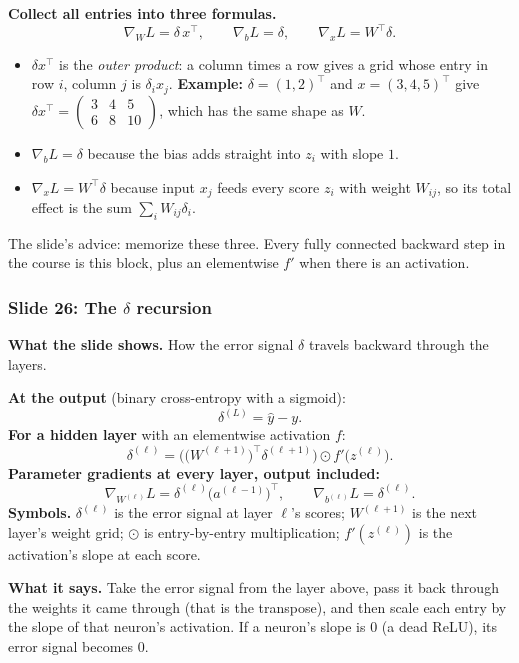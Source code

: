 \textbf{Collect all entries into three formulas.}
\[
\nabla_WL=\delta\,x^\top, \qquad \nabla_bL=\delta, \qquad \nabla_xL=W^\top\delta .
\]
\begin{itemize}
\item $\delta x^\top$ is the \emph{outer product}: a column times a row gives a grid whose entry in row $i$, column $j$ is $\delta_ix_j$. \textbf{Example:} $\delta=(1,2)^\top$ and $x=(3,4,5)^\top$ give $\delta x^\top=\begin{pmatrix}3&4&5\\6&8&10\end{pmatrix}$, which has the same shape as $W$.
\item $\nabla_bL=\delta$ because the bias adds straight into $z_i$ with slope $1$.
\item $\nabla_xL=W^\top\delta$ because input $x_j$ feeds every score $z_i$ with weight $W_{ij}$, so its total effect is the sum $\sum_iW_{ij}\delta_i$.
\end{itemize}
The slide's advice: memorize these three. Every fully connected backward step in the course is this block, plus an elementwise $f'$ when there is an activation.

\subsubsection{Slide 26: The $\delta$ recursion}

\textbf{What the slide shows.} How the error signal $\delta$ travels backward through the layers.

\textbf{At the output} (binary cross-entropy with a sigmoid):
\[
\delta^{(L)}=\hat{y}-y .
\]
\textbf{For a hidden layer} with an elementwise activation $f$:
\[
\delta^{(\ell)}=\Big(\big(W^{(\ell+1)}\big)^\top\delta^{(\ell+1)}\Big)\odot f'\big(z^{(\ell)}\big).
\]
\textbf{Parameter gradients at every layer, output included:}
\[
\nabla_{W^{(\ell)}}L=\delta^{(\ell)}\big(a^{(\ell-1)}\big)^\top, \qquad \nabla_{b^{(\ell)}}L=\delta^{(\ell)} .
\]
\textbf{Symbols.} $\delta^{(\ell)}$ is the error signal at layer $\ell$'s scores; $W^{(\ell+1)}$ is the next layer's weight grid; $\odot$ is entry-by-entry multiplication; $f'(z^{(\ell)})$ is the activation's slope at each score.

\textbf{What it says.} Take the error signal from the layer above, pass it back through the weights it came through (that is the transpose), and then scale each entry by the slope of that neuron's activation. If a neuron's slope is $0$ (a dead ReLU), its error signal becomes $0$.

